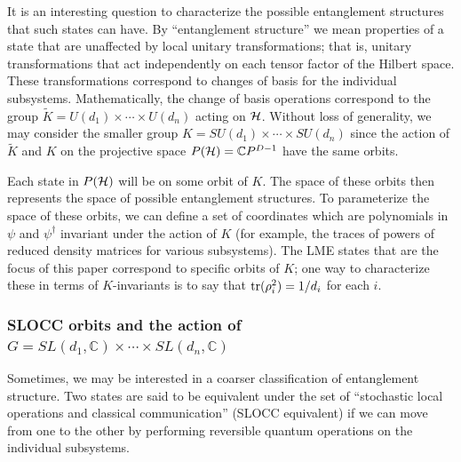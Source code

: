 \documentclass[12pt]{article}
\theoremstyle{definition}
\newcommand{\tr}{{\rm tr}}
\begin{document}
It is an interesting question to characterize the possible
entanglement structures that such states can have. By ``entanglement
structure'' we mean properties of a state that are unaffected by local
unitary transformations; that is, unitary transformations that act
independently on each tensor factor of the Hilbert space. These
transformations correspond to changes of basis for the individual
subsystems. Mathematically, the change of basis operations correspond
to the group $\tilde{K} = U(d_1) \times \cdots \times U(d_n)$ acting
on ${\cal H}$. Without loss of generality, we may consider the smaller
group $K = SU(d_{1})\times \dotsb \times SU(d_{n})$ since the action
of $\tilde{K}$ and $K$ on the projective space $P({\cal H}) = \mathbb{C}
P^{D-1}$ have the same orbits.

Each state in $P({\cal H})$ will be on some orbit of $K$. The space of these orbits then represents the space of possible entanglement structures. To parameterize the space of these orbits, we can define a set of coordinates which are polynomials in $\psi$ and $\psi^\dagger$ invariant under the action of $K$ (for example, the traces of powers of reduced density matrices for various subsystems). The LME states that are the focus of this paper correspond to specific orbits of $K$; one way to characterize these in terms of $K$-invariants is to say that $\tr(\rho_i^2) = 1/d_i$ for each $i$.

\subsubsection{SLOCC orbits and the action of $G = SL(d_1,\mathbb{C}) \times \cdots \times SL(d_n,\mathbb{C})$}

Sometimes, we may be interested in a coarser classification of entanglement structure. Two states are said to be equivalent under the set of ``stochastic local operations and classical communication'' (SLOCC equivalent) if we can move from one to the other by performing reversible quantum operations on the individual subsystems.
\end{document}
